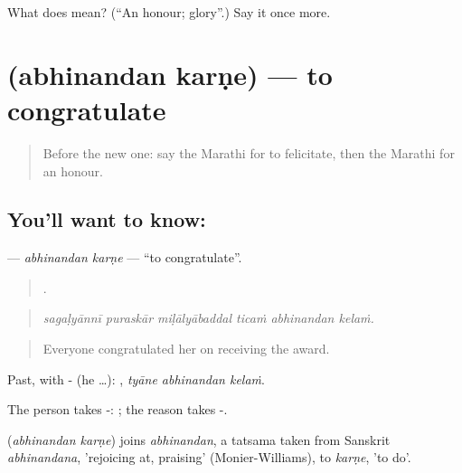 \begin{tcolorbox}[breakable,colback=teal!4,colframe=teal!35!black,title={Before you move on}]
What does  mean? (\textquotedblleft{}An honour; glory\textquotedblright{}.) Say it once more.
\end{tcolorbox}
\section[\texorpdfstring{\mr{अभिनंदन} \mr{करणे} (abhinandan karṇe)}{अभिनंदन करणे (abhinandan karṇe)}]{  (abhinandan karṇe) — to congratulate}

\label{lesson:MR-C322-abhinandan-karne}



\begin{quote}
Before the new one: say the Marathi for to felicitate, then the Marathi for an honour.
\end{quote}

\subsection*{You'll want to know:  }
\textbf{ } — \emph{abhinandan karṇe} — \textquotedblleft{}to congratulate\textquotedblright{}.

\begin{quote}
     .
\end{quote}

\begin{quote}
\emph{sagaḷyānnī puraskār miḷālyābaddal ticaṁ abhinandan kelaṁ.}
\end{quote}

\begin{quote}
Everyone congratulated her on receiving the award.
\end{quote}

Past, with - (he …):   , \emph{tyāne abhinandan kelaṁ}.

The person takes -:   ; the reason takes -.

\begin{cousinweb}
\textbf{ } (\emph{abhinandan karṇe}) joins \emph{abhinandan}, a tatsama taken from Sanskrit \emph{abhinandana}, 'rejoicing at, praising' (Monier-Williams), to \emph{karṇe}, 'to do'.
\end{cousinweb}

